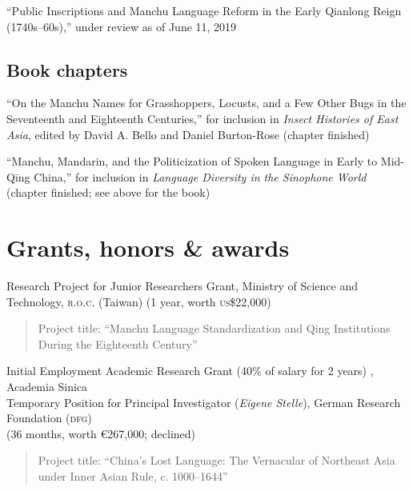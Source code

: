 \documentclass[10pt,a4paper]{article}
\newcommand{\years}[1]{\marginnote{\scriptsize #1}}
\begin{document}
\begin{exclude}
\noindent \years{\hspace{0.1in}。}``Public Inscriptions and Manchu Language Reform in the Early Qianlong Reign (1740s--60s),'' under review as of June 11, 2019

\subsection*{Book chapters%
}

\noindent \years{\hspace{0.1in}。}``On the Manchu Names for Grasshoppers, Locusts, and a Few Other Bugs in the Seventeenth and Eighteenth Centuries,'' for inclusion in \emph{Insect Histories of East Asia}, edited by David A. Bello and Daniel Burton-Rose (chapter finished)

\noindent \years{\hspace{0.1in}。}``Manchu, Mandarin, and the Politicization of Spoken Language in Early to Mid-Qīng China,'' for inclusion in \emph{Language Diversity in the Sinophone World} (chapter finished; see above for the book) 

\end{exclude}


\section*{Grants, honors \& awards%
} \label{GrantsHonorsAndAwards}
\noindent \years{2019}Research Project for Junior Researchers Grant, Ministry of Science and Technology, \textsc{r.o.c.} (Taiwan) (1 year, worth \textsc{us}\$22,000)
\begin{quote}Project title: ``Manchu Language Standardization and Qing Institutions During the Eighteenth Century''\end{quote}

\noindent \years{2019}Initial Employment Academic Research Grant (40\% of salary for 2 years)%
, Academia Sinica\\
\noindent \years{2018}Temporary Position for Principal Investigator (\emph{Eigene Stelle}), German Research Foundation (\textsc{dfg})\\ (36 months, worth €267,000; declined)
\begin{quote}Project title: ``China's Lost Language: The Vernacular of Northeast Asia under Inner Asian Rule, c. 1000--1644''\end{quote}
\end{document}
